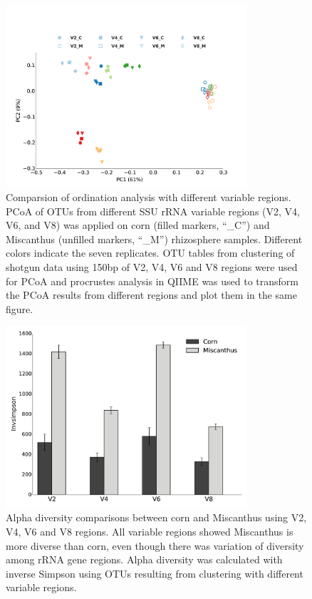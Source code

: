 \documentclass[]{msu-thesis}
\begin{document}
\begin{figure}[tbph!]
  \centering
  \includegraphics[width=0.80\textwidth]{figs/chap2_fig2}
  \caption[Comparsion of ordination analysis with different variable regions]{Comparsion of ordination analysis with different variable regions. PCoA of OTUs from different SSU rRNA variable regions (V2, V4, V6, and V8) was applied on corn (filled markers, ``\_C'') and Miscanthus (unfilled markers, ``\_M'') rhizosphere samples. Different colors indicate the seven replicates. OTU tables from clustering of shotgun data using 150bp of V2, V4, V6 and V8 regions were used for PCoA and procrustes analysis in QIIME was used to transform the PCoA results from different regions and plot them in the same figure.}
  \label{fig:chap2Fig2}
\end{figure}


\begin{figure}[tbph!]
  \centering
  \includegraphics[width=0.80\textwidth]{figs/chap2_fig3}
  \caption[Alpha diversity comparisons between corn and Miscanthus using V2, V4, V6 and V8 regions]{Alpha diversity comparisons between corn and Miscanthus using V2, V4, V6 and V8 regions. All variable regions showed Miscanthus is more diverse than corn, even though there was variation of diversity among rRNA gene regions. Alpha diversity was calculated with inverse Simpson using OTUs resulting from clustering with different variable regions.}
  \label{fig:chap2Fig3}
\end{figure}
\end{document}
